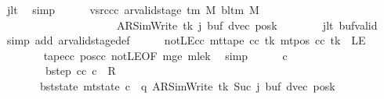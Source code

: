 \begin{isabellebody}
\ jlt\ \isamarkupfalse%
\ simp\isanewline
\ \ \ \ \isamarkupfalse%
\ vsrc{\isacharunderscore}{\kern0pt}cc{\isacharcolon}{\kern0pt}\ {\isachardoublequoteopen}ar{\isacharunderscore}{\kern0pt}valid{\isacharunderscore}{\kern0pt}stage\ {\isacharparenleft}{\kern0pt}{\isasymGamma}{\isacharunderscore}{\kern0pt}tm\ M{\isacharparenright}{\kern0pt}\ {\isacharparenleft}{\kern0pt}bl{\isacharunderscore}{\kern0pt}tm\ M{\isacharparenright}{\kern0pt}\isanewline
\ \ \ \ \ \ \ \ \ \ \ \ \ \ \ \ \ \ \ \ \ {\isacharparenleft}{\kern0pt}AR{\isacharunderscore}{\kern0pt}SimWrite{\isacharcomma}{\kern0pt}\ tk{\isacharcomma}{\kern0pt}\ j{\isacharcomma}{\kern0pt}\ buf{\isacharcomma}{\kern0pt}\ dvec{\isacharcomma}{\kern0pt}\ posk{\isacharparenright}{\kern0pt}{\isachardoublequoteclose}\isanewline
\ \ \ \ \ \ \isamarkupfalse%
\ jlt{}\ buf{\isacharunderscore}{\kern0pt}valid\ \isamarkupfalse%
\ {\isacharparenleft}{\kern0pt}simp\ add{\isacharcolon}{\kern0pt}\ ar{\isacharunderscore}{\kern0pt}valid{\isacharunderscore}{\kern0pt}stage{\isacharunderscore}{\kern0pt}def{\isacharparenright}{\kern0pt}\isanewline
\ \ \ \ \isamarkupfalse%
\ notLE{\isacharunderscore}{\kern0pt}cc{\isacharcolon}{\kern0pt}\ {\isachardoublequoteopen}mt{\isacharunderscore}{\kern0pt}tape\ cc\ tk\ {\isacharparenleft}{\kern0pt}mt{\isacharunderscore}{\kern0pt}pos\ cc\ tk{\isacharparenright}{\kern0pt}\ {\isasymnoteq}\ LE{}{\isachardoublequoteclose}\isanewline
\ \ \ \ \ \ \isamarkupfalse%
\ tape{\isacharunderscore}{\kern0pt}cc\ pos{\isacharunderscore}{\kern0pt}cc\ notLE{\isacharbrackleft}{\kern0pt}OF\ mge{}\ mlek{\isacharbrackright}{\kern0pt}\ \isamarkupfalse%
\ simp\isanewline
\ \ \ \ \isamarkupfalse%
\ c{\isacharprime}{\kern0pt}{\isacharprime}{\kern0pt}\ \isanewline
\ \ \ \ \ \ \ \ bstep{\isacharcolon}{\kern0pt}\ {\isachardoublequoteopen}{\isacharparenleft}{\kern0pt}cc{\isacharcomma}{\kern0pt}\ c{\isacharprime}{\kern0pt}{\isacharprime}{\kern0pt}{\isacharparenright}{\kern0pt}\ {\isasymin}\ R{\isacharprime}{\kern0pt}{\isachardoublequoteclose}\isanewline
\ \ \ \ \ \ \ bst{\isacharunderscore}{\kern0pt}state{\isacharcolon}{\kern0pt}\ {\isachardoublequoteopen}mt{\isacharunderscore}{\kern0pt}state\ c{\isacharprime}{\kern0pt}{\isacharprime}{\kern0pt}\ {\isacharequal}{\kern0pt}\ {\isacharparenleft}{\kern0pt}q{\isacharcomma}{\kern0pt}\ AR{\isacharunderscore}{\kern0pt}SimWrite{\isacharcomma}{\kern0pt}\ tk{\isacharcomma}{\kern0pt}\ Suc\ j{\isacharcomma}{\kern0pt}\ buf{\isacharcomma}{\kern0pt}\ dvec{\isacharcomma}{\kern0pt}\ posk{\isacharparenright}{\kern0pt}{\isachardoublequoteclose}\isanewline

\end{isabellebody}
